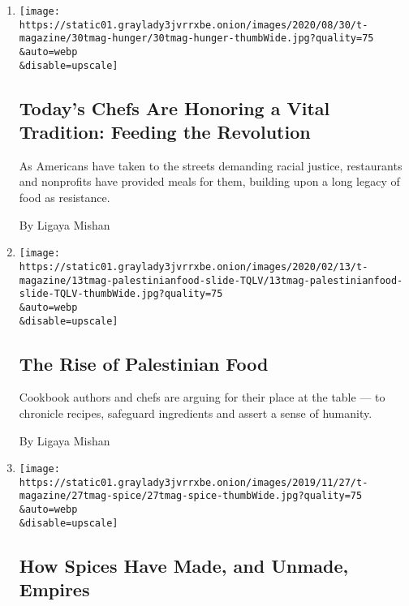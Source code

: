 \begin{enumerate}
\def\labelenumi{\arabic{enumi}.}
\item
  \href{/2020/08/28/t-magazine/food-protest-revolution.html}{}

  \texttt{[image: https://static01.graylady3jvrrxbe.onion/images/2020/08/30/t-magazine/30tmag-hunger/30tmag-hunger-thumbWide.jpg?quality=75\\\&auto=webp\\\&disable=upscale]}

  \hypertarget{todays-chefs-are-honoring-a-vital-tradition-feeding-the-revolution}{%
  \subsection{Today's Chefs Are Honoring a Vital Tradition: Feeding the
  Revolution}\label{todays-chefs-are-honoring-a-vital-tradition-feeding-the-revolution}}

  As Americans have taken to the streets demanding racial justice,
  restaurants and nonprofits have provided meals for them, building upon
  a long legacy of food as resistance.

  By Ligaya Mishan
\item
  \href{/2020/02/12/t-magazine/palestinian-food.html}{}

  \texttt{[image: https://static01.graylady3jvrrxbe.onion/images/2020/02/13/t-magazine/13tmag-palestinianfood-slide-TQLV/13tmag-palestinianfood-slide-TQLV-thumbWide.jpg?quality=75\\\&auto=webp\\\&disable=upscale]}

  \hypertarget{the-rise-of-palestinian-food}{%
  \subsection{The Rise of Palestinian
  Food}\label{the-rise-of-palestinian-food}}

  Cookbook authors and chefs are arguing for their place at the table
  --- to chronicle recipes, safeguard ingredients and assert a sense of
  humanity.

  By Ligaya Mishan
\item
  \href{/2019/11/27/t-magazine/spices.html}{}

  \texttt{[image: https://static01.graylady3jvrrxbe.onion/images/2019/11/27/t-magazine/27tmag-spice/27tmag-spice-thumbWide.jpg?quality=75\\\&auto=webp\\\&disable=upscale]}

  \hypertarget{how-spices-have-made-and-unmade-empires}{%
  \subsection{How Spices Have Made, and Unmade,
  Empires}\label{how-spices-have-made-and-unmade-empires}}


\end{enumerate}
